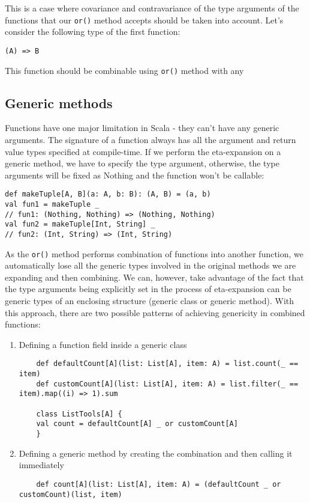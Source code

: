 This is a case where covariance and contravariance of the type arguments of the functions that our \lstinline|or()| method accepts should be taken into account. Let's consider the following type of the first function:

\lstset{style=Scala}
\begin{lstlisting}
(A) => B
\end{lstlisting}

This function should be combinable using \lstinline|or()| method with any 

\subsection{Generic methods}



Functions have one major limitation in Scala - they can't have any generic arguments. The signature of a function always has all the argument and return value types specified at compile-time. If we perform the eta-expansion on a generic method, we have to specify the type argument, otherwise, the type arguments will be fixed as Nothing and the function won't be callable:

\lstset{style=Scala}
\begin{lstlisting}
def makeTuple[A, B](a: A, b: B): (A, B) = (a, b)
val fun1 = makeTuple _
// fun1: (Nothing, Nothing) => (Nothing, Nothing)
val fun2 = makeTuple[Int, String] _
// fun2: (Int, String) => (Int, String)
\end{lstlisting}

As the \lstinline|or()| method performs combination of functions into another function, we automatically lose all the generic types involved in the original methods we are expanding and then combining. We can, however, take advantage of the fact that the type arguments being explicitly set in the process of eta-expansion can be generic types of an enclosing structure (generic class or generic method). With this approach, there are two possible patterns of achieving genericity in combined functions:

\begin{enumerate}
	\item Defining a function field inside a generic class
	\lstset{style=Scala}
	\begin{lstlisting}
	def defaultCount[A](list: List[A], item: A) = list.count(_ == item)
	def customCount[A](list: List[A], item: A) = list.filter(_ == item).map((i) => 1).sum
	
	class ListTools[A] {
	val count = defaultCount[A] _ or customCount[A]
	}
	\end{lstlisting}
	\item Defining a generic method by creating the combination and then calling it immediately
	\lstset{style=Scala}
	\begin{lstlisting}
	def count[A](list: List[A], item: A) = (defaultCount _ or customCount)(list, item)
	\end{lstlisting}
\end{enumerate}



